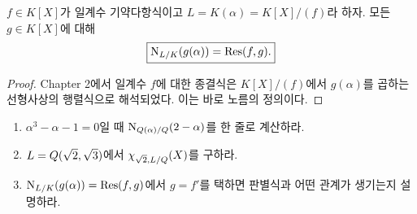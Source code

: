 \begin{corollary}[종결식과 노름]
\label{cor:resultant-as-field-norm}
$f\in K[X]$가 일계수 기약다항식이고
$L=K(\alpha)=K[X]/(f)$라 하자. 모든 $g\in K[X]$에 대해
\[
  \boxed{
  \operatorname{N}_{L/K}(g(\alpha))
  =\operatorname{Res}(f,g).}
\]
\end{corollary}

\begin{proof}
Chapter 2에서 일계수 $f$에 대한 종결식은
$K[X]/(f)$에서 $g(\alpha)$를 곱하는 선형사상의 행렬식으로 해석되었다.
이는 바로 노름의 정의이다.
\end{proof}

\begin{checkpoint}
\begin{enumerate}[label=(\alph*)]
  \item $\alpha^3-\alpha-1=0$일 때
  $\operatorname{N}_{Q(\alpha)/Q}(2-\alpha)$를 한 줄로 계산하라.
  \item $L=Q(\sqrt2,\sqrt3)$에서
  $\chi_{\sqrt2,L/Q}(X)$를 구하라.
  \item $\operatorname{N}_{L/K}(g(\alpha))=\operatorname{Res}(f,g)$에서 $g=f'$를 택하면
  판별식과 어떤 관계가 생기는지 설명하라.
\end{enumerate}
\end{checkpoint}
